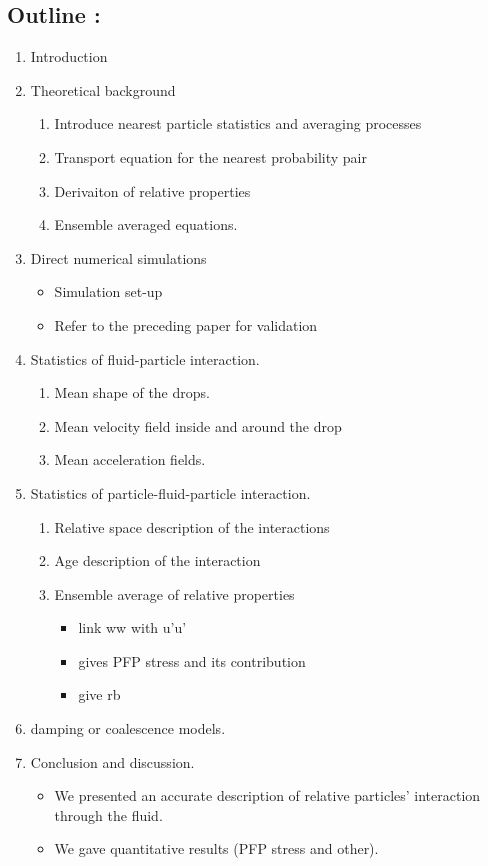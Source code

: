 \documentclass[12pt]{book}
\begin{document}
\subsection*{Outline :}
\begin{enumerate}
    \item Introduction
    \item Theoretical background 
    \begin{enumerate}
        \item Introduce nearest particle statistics and averaging processes
        \item Transport equation for the nearest probability pair
        \item Derivaiton of relative properties 
        \item Ensemble averaged equations. 
    \end{enumerate}
    \item Direct numerical simulations
    \begin{itemize}
        \item Simulation set-up
        \item Refer to the preceding paper for validation
    \end{itemize}
    \item Statistics of fluid-particle interaction.   
    \begin{enumerate}
        \item Mean shape of the drops. 
        \item Mean velocity field inside and around the drop 
        \item Mean acceleration fields. 
    \end{enumerate}
    \item Statistics of particle-fluid-particle interaction.   
    \begin{enumerate}
        \item Relative space description of the interactions 
        \item Age description of the interaction
        \item Ensemble average of relative properties
        \begin{itemize}
            \item  link ww with u'u'
            \item gives PFP stress and its contribution
            \item give rb 
        \end{itemize}
    \end{enumerate}
    \item damping or coalescence models. 
    \item Conclusion and discussion.
    \begin{itemize}
        \item We presented an accurate description of relative particles' interaction through the fluid. 
        \item We gave quantitative results (PFP stress and other). 
    \end{itemize}
\end{enumerate}
\end{document}

